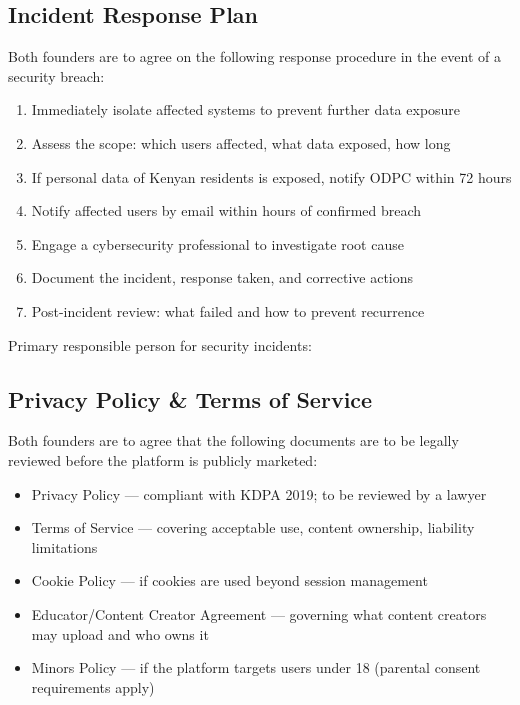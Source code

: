 \documentclass[12pt,a4paper]{article}
\newcommand{\blank}[1][5.5cm]{\underline{\hspace{#1}}}
\newcommand{\cb}{$\square$\;}                   %
\begin{document}
\subsection{Incident Response Plan}

Both founders are to agree on the following response procedure in the event of a security breach:

\begin{enumerate}
  \item Immediately isolate affected systems to prevent further data exposure
  \item Assess the scope: which users affected, what data exposed, how long
  \item If personal data of Kenyan residents is exposed, notify ODPC within 72 hours
  \item Notify affected users by email within \blank[2cm] hours of confirmed breach
  \item Engage a cybersecurity professional to investigate root cause
  \item Document the incident, response taken, and corrective actions
  \item Post-incident review: what failed and how to prevent recurrence
\end{enumerate}

\noindent Primary responsible person for security incidents: \blank[5cm]

\subsection{Privacy Policy \& Terms of Service}

Both founders are to agree that the following documents are to be legally reviewed before the platform is publicly marketed:

\begin{itemize}[label=\cb]
  \item Privacy Policy --- compliant with KDPA 2019; to be reviewed by a lawyer
  \item Terms of Service --- covering acceptable use, content ownership, liability limitations
  \item Cookie Policy --- if cookies are used beyond session management
  \item Educator/Content Creator Agreement --- governing what content creators may upload and who owns it
  \item Minors Policy --- if the platform targets users under 18 (parental consent requirements apply)
\end{itemize}
\end{document}
